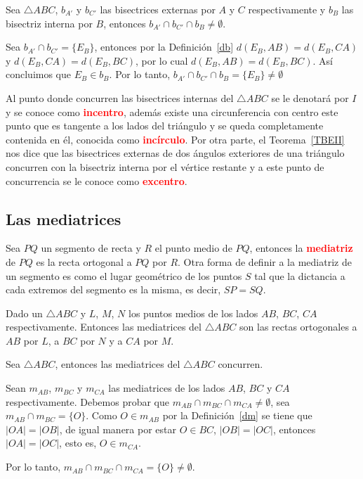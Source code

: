 \begin{teo}\label{TBEII}
Sea $\triangle ABC$, $b_{A'}$ y $b_{C'}$ las bisectrices externas por $A$ y $C$ respectivamente y $b_{B}$ las bisectriz interna por $B$, entonces $b_{A'}\cap b_{C'}\cap b_{B}\neq\emptyset$.
\end{teo}
\begin{dem}
Sea $b_{A'}\cap b_{C'}=\{E_{B}\}$, entonces por la Definición~\ref{db} $d(E_{B},AB)=d(E_{B},CA)$ y $d(E_{B},CA)=d(E_{B},BC)$, por lo cual $d(E_{B},AB)=d(E_{B},BC)$. Así concluimos que $E_{B}\in b_{B}$. Por lo tanto, $b_{A'}\cap b_{C'}\cap b_{B}=\{E_{B}\}\neq\emptyset$
\end{dem}

Al punto donde concurren las bisectrices internas del $\triangle ABC$ se le denotará por $I$ y se conoce como \textcolor{red}{\bf incentro}, además existe una circunferencia con centro este punto que es tangente a los lados del triángulo y se queda completamente contenida en él, conocida como \textcolor{red}{\bf incírculo}. Por otra parte, el Teorema~\ref{TBEII} nos dice que las bisectrices externas de dos ángulos exteriores de una triángulo concurren con la bisectriz interna por el vértice restante y a este punto de concurrencia se le conoce como \textcolor{red}{\bf excentro}. 
\subsection{Las mediatrices}

\begin{df}\label{dm}
Sea $PQ$ un segmento de recta y $R$ el punto medio de $PQ$, entonces la \textcolor{red}{\bf mediatriz} de $PQ$ es la recta ortogonal a $PQ$ por $R$. Otra forma de definir a la mediatriz de un segmento es como el lugar geométrico de los puntos $S$ tal que la dictancia a cada extremos del segmento es la misma, es decir, $SP=SQ$.
\end{df}

Dado un $\triangle ABC$ y $L$, $M$, $N$ los puntos medios de los lados $AB$, $BC$, $CA$ respectivamente. Entonces las mediatrices del $\triangle ABC$ son las rectas ortogonales a $AB$ por $L$, a $BC$ por $N$ y a $CA$ por $M$.

\begin{teo}\label{LMDTC}
Sea $\triangle ABC$, entonces las mediatrices del $\triangle ABC$ concurren.
\end{teo}
\begin{dem}
Sean $m_{AB}$, $m_{BC}$ y $m_{CA}$ las mediatrices de los lados $AB$, $BC$ y $CA$ respectivamente. Debemos probar que $m_{AB}\cap m_{BC}\cap m_{CA}\neq\emptyset$, sea $m_{AB}\cap m_{BC}=\{O\}$. Como $O\in m_{AB}$ por la Definición~\ref{dm} se tiene que $|OA|=|OB|$, de igual manera por estar $O\in {BC}$, $|OB|=|OC|$, entonces $|OA|=|OC|$, esto es, $O\in m_{CA}$.

Por lo tanto, $m_{AB}\cap m_{BC}\cap m_{CA}=\{O\}\neq\emptyset$. 
\end{dem}
 
